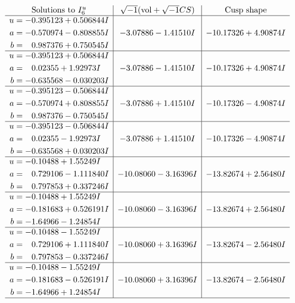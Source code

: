 \documentclass[1p]{elsarticle_modified}
\theoremstyle{definition}
\newcommand{\I}{\sqrt{-1}}
\begin{document}
$$\begin{array}{c|c|c}  
\text{Solutions to }I^u_{6}& \I (\text{vol} + \sqrt{-1}CS) & \text{Cusp shape}\\
 \hline 
\begin{aligned}
u &= -0.395123 + 0.506844 I \\
a &= -0.570974 - 0.808855 I \\
b &= \phantom{-}0.987376 + 0.750545 I\end{aligned}
 & -3.07886 - 1.41510 I & -10.17326 + 4.90874 I \\ \hline\begin{aligned}
u &= -0.395123 + 0.506844 I \\
a &= \phantom{-}0.02355 + 1.92973 I \\
b &= -0.635568 - 0.030203 I\end{aligned}
 & -3.07886 - 1.41510 I & -10.17326 + 4.90874 I \\ \hline\begin{aligned}
u &= -0.395123 - 0.506844 I \\
a &= -0.570974 + 0.808855 I \\
b &= \phantom{-}0.987376 - 0.750545 I\end{aligned}
 & -3.07886 + 1.41510 I & -10.17326 - 4.90874 I \\ \hline\begin{aligned}
u &= -0.395123 - 0.506844 I \\
a &= \phantom{-}0.02355 - 1.92973 I \\
b &= -0.635568 + 0.030203 I\end{aligned}
 & -3.07886 + 1.41510 I & -10.17326 - 4.90874 I \\ \hline\begin{aligned}
u &= -0.10488 + 1.55249 I \\
a &= \phantom{-}0.729106 - 1.111840 I \\
b &= \phantom{-}0.797853 + 0.337246 I\end{aligned}
 & -10.08060 - 3.16396 I & -13.82674 + 2.56480 I \\ \hline\begin{aligned}
u &= -0.10488 + 1.55249 I \\
a &= -0.181683 + 0.526191 I \\
b &= -1.64966 - 1.24854 I\end{aligned}
 & -10.08060 - 3.16396 I & -13.82674 + 2.56480 I \\ \hline\begin{aligned}
u &= -0.10488 - 1.55249 I \\
a &= \phantom{-}0.729106 + 1.111840 I \\
b &= \phantom{-}0.797853 - 0.337246 I\end{aligned}
 & -10.08060 + 3.16396 I & -13.82674 - 2.56480 I \\ \hline\begin{aligned}
u &= -0.10488 - 1.55249 I \\
a &= -0.181683 - 0.526191 I \\
b &= -1.64966 + 1.24854 I\end{aligned}
 & -10.08060 + 3.16396 I & -13.82674 - 2.56480 I\\
 \hline 
 \end{array}$$\newpage\newpage\renewcommand{\arraystretch}{1}
\end{document}
